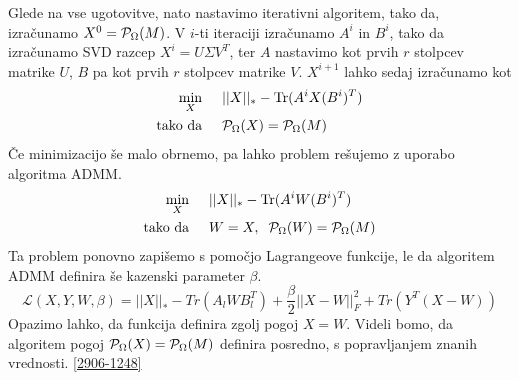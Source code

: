 Glede na vse ugotovitve, nato nastavimo iterativni algoritem, tako da, izračunamo $X^0 = \mathcal{P}_\Omega(M)$. V $i$-ti iteraciji izračunamo $A^i$ in $B^i$, tako da izračunamo SVD razcep $X^i = U \Sigma V^T$, ter $A$ nastavimo kot prvih $r$ stolpcev matrike $U$, $B$ pa kot prvih $r$ stolpcev matrike $V$. $X^{i+1}$ lahko sedaj izračunamo kot \cite{TNNM-HZYLH12}
\begin{align*}
    \min_X \hspace{0.5cm} &||X||_* - \text{Tr}(A^iX(B^i)^T)\\
    \text{tako da} \hspace{0.5cm} &\mathcal{P}_\Omega(X) = \mathcal{P}_\Omega(M)
\end{align*}
Če minimizacijo še malo obrnemo, pa lahko problem rešujemo z uporabo algoritma ADMM.  
\begin{align*}
    \min_X \hspace{0.5cm} &||X||_* - \text{Tr}(A^iW(B^i)^T)\\
    \text{tako da} \hspace{0.5cm} &W=X, \hspace{0.2cm} \mathcal{P}_\Omega(W) = \mathcal{P}_\Omega(M)
\end{align*}
Ta problem ponovno zapišemo s pomočjo Lagrangeove funkcije, le da algoritem ADMM definira še kazenski parameter $\beta$. \cite{TNNM-HZYLH12} 
\[ 
\mathcal{L}(X, Y, W, \beta) = ||X||_* - Tr(A_l W B_l^T) + \frac{\beta}{2} ||X - W||_F^2 + Tr(Y^T(X-W))
\]
Opazimo lahko, da funkcija definira zgolj pogoj $X = W$. Videli bomo, da algoritem pogoj $\mathcal{P}_\Omega(X) = \mathcal{P}_\Omega(M)$ definira posredno, s popravljanjem znanih vrednosti. \ref{2906-1248}

